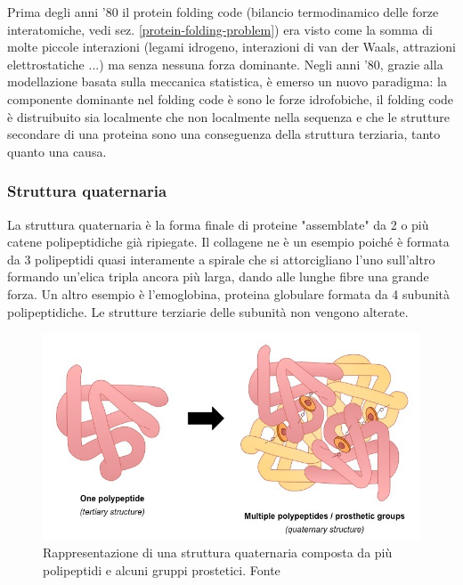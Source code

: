 {\par Prima degli anni '80 il protein folding code (bilancio termodinamico delle forze interatomiche, vedi sez. \ref{protein-folding-problem}) era visto come la somma di molte piccole interazioni (legami idrogeno, interazioni di van der Waals, attrazioni elettrostatiche ...) ma senza nessuna forza dominante\supercite{dill2008protein}. Negli anni '80, grazie alla modellazione basata sulla meccanica statistica, è emerso un nuovo paradigma: la componente dominante nel folding code è sono le forze idrofobiche, il folding code è distruibuito sia localmente che non localmente nella sequenza e che le strutture secondare di una proteina sono una conseguenza della struttura terziaria, tanto quanto una causa.

\subsubsection{Struttura quaternaria}
La struttura quaternaria è la forma finale di proteine "assemblate" da 2 o più catene polipeptidiche già ripiegate. Il collagene ne è un esempio poiché è formata da 3 polipeptidi quasi interamente a spirale che si attorcigliano l'uno sull'altro formando un'elica tripla ancora più larga, dando alle lunghe fibre una grande forza. Un altro esempio è l'emoglobina, proteina globulare formata da 4 subunità polipeptidiche. Le strutture terziarie delle subunità non vengono alterate.

\begin{figure}[!htb]
	\centering
	\includegraphics[scale=0.35]{images/quaternary-structure_med.jpeg}
	\caption{Rappresentazione di una struttura quaternaria composta da più polipeptidi e alcuni gruppi prostetici. Fonte \cite{proteinStrucBioNinja}}
	\label{fig:struttura-quaternaria}
\end{figure}

}
